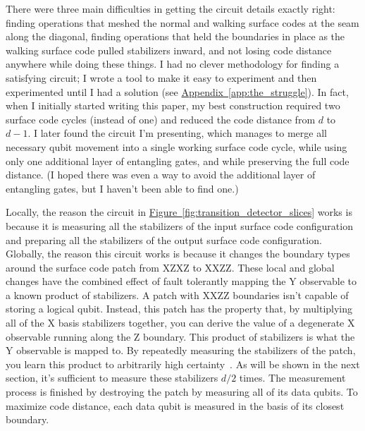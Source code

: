 \documentclass[onecolumn,unpublished,a4paper]{quantumarticle}
\theoremstyle{definition}
\theoremstyle{definition}
\theoremstyle{definition}
\DeclareRobustCommand{\app}[1]{\hyperref[app:#1]{Appendix~\ref*{app:#1}}}
\newcommand{\fig}[1]{\hyperref[fig:#1]{Figure~\ref*{fig:#1}}}
\begin{document}
There were three main difficulties in getting the circuit details exactly right: finding operations that meshed the normal and walking surface codes at the seam along the diagonal, finding operations that held the boundaries in place as the walking surface code pulled stabilizers inward, and not losing code distance anywhere while doing these things.
I had no clever methodology for finding a satisfying circuit; I wrote a tool to make it easy to experiment and then experimented until I had a solution (see \app{the_struggle}).
In fact, when I initially started writing this paper, my best construction required two surface code cycles (instead of one) and reduced the code distance from $d$ to $d-1$.
I later found the circuit I'm presenting, which manages to merge all necessary qubit movement into a single working surface code cycle, while using only one additional layer of entangling gates, and while preserving the full code distance.
(I hoped there was even a way to avoid the additional layer of entangling gates, but I haven't been able to find one.)

Locally, the reason the circuit in \fig{transition_detector_slices} works is because it is measuring all the stabilizers of the input surface code configuration and preparing all the stabilizers of the output surface code configuration.
Globally, the reason this circuit works is because it changes the boundary types around the surface code patch from XZXZ to XXZZ.
These local and global changes have the combined effect of fault tolerantly mapping the Y observable to a known product of stabilizers.
A patch with XXZZ boundaries isn't capable of storing a logical qubit.
Instead, this patch has the property that, by multiplying all of the X basis stabilizers together, you can derive the value of a degenerate X observable running along the Z boundary.
This product of stabilizers is what the Y observable is mapped to.
By repeatedly measuring the stabilizers of the patch, you learn this product to arbitrarily high certainty~\cite{gidney2022stability}.
As will be shown in the next section, it's sufficient to measure these stabilizers $d/2$ times.
The measurement process is finished by destroying the patch by measuring all of its data qubits.
To maximize code distance, each data qubit is measured in the basis of its closest boundary.
\end{document}
